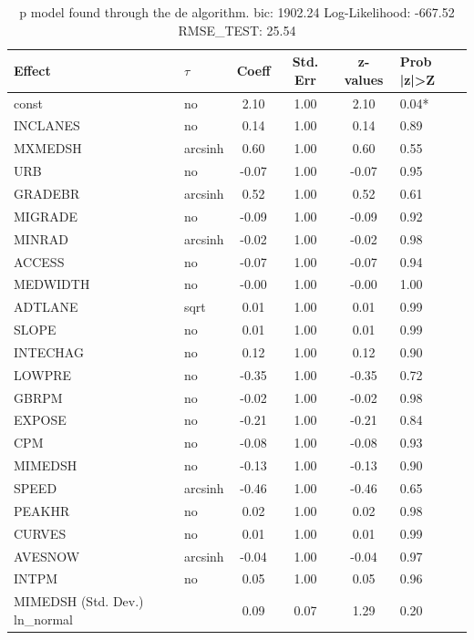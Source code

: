 \begin{table}
	\caption{p model found through the de algorithm. bic: 1902.24 Log-Likelihood: -667.52 RMSE_TEST: 25.54}
	\begin{center}
		\begin{tabular}{|l|l|c|c|c|l|}
			\hline
			Effect & $\tau$ & Coeff & Std. Err & z-values & Prob |z|>Z \\
			\hline
			const & no & 2.10 & 1.00 & 2.10 & 0.04* \\
			\hline
			INCLANES & no & 0.14 & 1.00 & 0.14 & 0.89 \\
			\hline
			MXMEDSH & arcsinh & 0.60 & 1.00 & 0.60 & 0.55 \\
			\hline
			URB & no & -0.07 & 1.00 & -0.07 & 0.95 \\
			\hline
			GRADEBR & arcsinh & 0.52 & 1.00 & 0.52 & 0.61 \\
			\hline
			MIGRADE & no & -0.09 & 1.00 & -0.09 & 0.92 \\
			\hline
			MINRAD & arcsinh & -0.02 & 1.00 & -0.02 & 0.98 \\
			\hline
			ACCESS & no & -0.07 & 1.00 & -0.07 & 0.94 \\
			\hline
			MEDWIDTH & no & -0.00 & 1.00 & -0.00 & 1.00 \\
			\hline
			ADTLANE & sqrt & 0.01 & 1.00 & 0.01 & 0.99 \\
			\hline
			SLOPE & no & 0.01 & 1.00 & 0.01 & 0.99 \\
			\hline
			INTECHAG & no & 0.12 & 1.00 & 0.12 & 0.90 \\
			\hline
			LOWPRE & no & -0.35 & 1.00 & -0.35 & 0.72 \\
			\hline
			GBRPM & no & -0.02 & 1.00 & -0.02 & 0.98 \\
			\hline
			EXPOSE & no & -0.21 & 1.00 & -0.21 & 0.84 \\
			\hline
			CPM & no & -0.08 & 1.00 & -0.08 & 0.93 \\
			\hline
			MIMEDSH & no & -0.13 & 1.00 & -0.13 & 0.90 \\
			\hline
			SPEED & arcsinh & -0.46 & 1.00 & -0.46 & 0.65 \\
			\hline
			PEAKHR & no & 0.02 & 1.00 & 0.02 & 0.98 \\
			\hline
			CURVES & no & 0.01 & 1.00 & 0.01 & 0.99 \\
			\hline
			AVESNOW & arcsinh & -0.04 & 1.00 & -0.04 & 0.97 \\
			\hline
			INTPM & no & 0.05 & 1.00 & 0.05 & 0.96 \\
			\hline
			MIMEDSH (Std. Dev.) ln_normal &  & 0.09 & 0.07 & 1.29 & 0.20 \\

\end{tabular}
\end{center}
\end{table}
